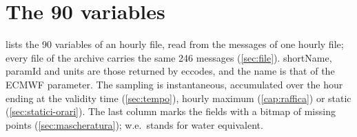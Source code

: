 \chapter{The 90 variables}
\label{app:variabili}

 lists the 90 variables of an hourly file, read from the messages of one hourly
file; every file of the archive carries the same 246 messages (\cref{sec:file}). shortName, paramId
and units are those returned by eccodes, and the name is that of the ECMWF parameter. The sampling
is instantaneous, accumulated over the hour ending at the validity time (\cref{sec:tempo}), hourly maximum (\cref{cap:raffica})
or static (\cref{sec:statici-orari}). The last column marks the fields with a bitmap of missing
points (\cref{sec:mascheratura}); w.e.\ stands for water equivalent.

